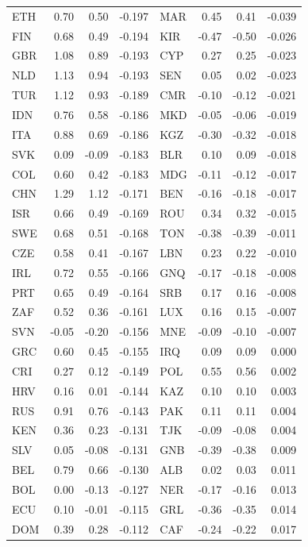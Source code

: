 \begin{table}[H]
\begin{threeparttable}
\begin{tabular}{lrrr@{\hskip 2em}lrrr}
ETH & 0.70 & 0.50 & -0.197 & MAR & 0.45 & 0.41 & -0.039 \\
FIN & 0.68 & 0.49 & -0.194 & KIR & -0.47 & -0.50 & -0.026 \\
GBR & 1.08 & 0.89 & -0.193 & CYP & 0.27 & 0.25 & -0.023 \\
NLD & 1.13 & 0.94 & -0.193 & SEN & 0.05 & 0.02 & -0.023 \\
TUR & 1.12 & 0.93 & -0.189 & CMR & -0.10 & -0.12 & -0.021 \\
IDN & 0.76 & 0.58 & -0.186 & MKD & -0.05 & -0.06 & -0.019 \\
ITA & 0.88 & 0.69 & -0.186 & KGZ & -0.30 & -0.32 & -0.018 \\
SVK & 0.09 & -0.09 & -0.183 & BLR & 0.10 & 0.09 & -0.018 \\
COL & 0.60 & 0.42 & -0.183 & MDG & -0.11 & -0.12 & -0.017 \\
CHN & 1.29 & 1.12 & -0.171 & BEN & -0.16 & -0.18 & -0.017 \\
ISR & 0.66 & 0.49 & -0.169 & ROU & 0.34 & 0.32 & -0.015 \\
SWE & 0.68 & 0.51 & -0.168 & TON & -0.38 & -0.39 & -0.011 \\
CZE & 0.58 & 0.41 & -0.167 & LBN & 0.23 & 0.22 & -0.010 \\
IRL & 0.72 & 0.55 & -0.166 & GNQ & -0.17 & -0.18 & -0.008 \\
PRT & 0.65 & 0.49 & -0.164 & SRB & 0.17 & 0.16 & -0.008 \\
ZAF & 0.52 & 0.36 & -0.161 & LUX & 0.16 & 0.15 & -0.007 \\
SVN & -0.05 & -0.20 & -0.156 & MNE & -0.09 & -0.10 & -0.007 \\
GRC & 0.60 & 0.45 & -0.155 & IRQ & 0.09 & 0.09 & 0.000 \\
CRI & 0.27 & 0.12 & -0.149 & POL & 0.55 & 0.56 & 0.002 \\
HRV & 0.16 & 0.01 & -0.144 & KAZ & 0.10 & 0.10 & 0.003 \\
RUS & 0.91 & 0.76 & -0.143 & PAK & 0.11 & 0.11 & 0.004 \\
KEN & 0.36 & 0.23 & -0.131 & TJK & -0.09 & -0.08 & 0.004 \\
SLV & 0.05 & -0.08 & -0.131 & GNB & -0.39 & -0.38 & 0.009 \\
BEL & 0.79 & 0.66 & -0.130 & ALB & 0.02 & 0.03 & 0.011 \\
BOL & 0.00 & -0.13 & -0.127 & NER & -0.17 & -0.16 & 0.013 \\
ECU & 0.10 & -0.01 & -0.115 & GRL & -0.36 & -0.35 & 0.014 \\
DOM & 0.39 & 0.28 & -0.112 & CAF & -0.24 & -0.22 & 0.017 \\

\end{tabular}
\end{threeparttable}
\end{table}
